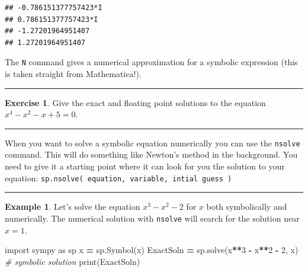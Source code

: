 \documentclass[
]{book}
\newenvironment{Shaded}{\begin{snugshade}}{\end{snugshade}}
\newcommand{\BuiltInTok}[1]{#1}
\newcommand{\CommentTok}[1]{\textcolor[rgb]{0.56,0.35,0.01}{\textit{#1}}}
\newcommand{\DecValTok}[1]{\textcolor[rgb]{0.00,0.00,0.81}{#1}}
\newcommand{\ImportTok}[1]{#1}
\newcommand{\NormalTok}[1]{#1}
\newcommand{\OperatorTok}[1]{\textcolor[rgb]{0.81,0.36,0.00}{\textbf{#1}}}
\newcommand{\StringTok}[1]{\textcolor[rgb]{0.31,0.60,0.02}{#1}}
\theoremstyle{definition}
\theoremstyle{definition}
\newtheorem{example}{Example}[chapter]
\theoremstyle{definition}
\newtheorem{exercise}{Exercise}[chapter]
\theoremstyle{remark}
\begin{document}
\begin{verbatim}
## -0.786151377757423*I
## 0.786151377757423*I
## -1.27201964951407
## 1.27201964951407
\end{verbatim}

The \texttt{N} command gives a numerical approximation for a symbolic expression (this is taken straight from Mathematica!).

\begin{center}\rule{0.5\linewidth}{0.5pt}\end{center}

\begin{exercise}
\protect\hypertarget{exr:unnamed-chunk-825}{}{\label{exr:unnamed-chunk-825} }Give the exact and floating point solutions to the equation \(x^4 - x^2 - x + 5 = 0\).
\end{exercise}

\begin{center}\rule{0.5\linewidth}{0.5pt}\end{center}

When you want to solve a symbolic equation numerically you can use the \texttt{nsolve} command. This will do something like Newton's method in the background. You need to give it a starting point where it can look for you the solution to your equation: \texttt{sp.nsolve(\ equation,\ variable,\ intial\ guess\ )}

\begin{center}\rule{0.5\linewidth}{0.5pt}\end{center}

\begin{example}
\protect\hypertarget{exm:unnamed-chunk-826}{}{\label{exm:unnamed-chunk-826} }Let's solve the equation \(x^3 - x^2 - 2\) for \(x\) both symbolically and numerically. The numerical solution with \texttt{nsolve} will search for the solution near \(x=1\).
\end{example}

\begin{Shaded}
\begin{Highlighting}[]
\ImportTok{import}\NormalTok{ sympy }\ImportTok{as}\NormalTok{ sp}
\NormalTok{x }\OperatorTok{=}\NormalTok{ sp.Symbol(}\StringTok{\textquotesingle{}x\textquotesingle{}}\NormalTok{)}
\NormalTok{ExactSoln }\OperatorTok{=}\NormalTok{ sp.solve(x}\OperatorTok{**}\DecValTok{3} \OperatorTok{{-}}\NormalTok{ x}\OperatorTok{**}\DecValTok{2} \OperatorTok{{-}} \DecValTok{2}\NormalTok{, x) }\CommentTok{\# symbolic solution}
\BuiltInTok{print}\NormalTok{(ExactSoln)}
\end{Highlighting}
\end{Shaded}
\end{document}
